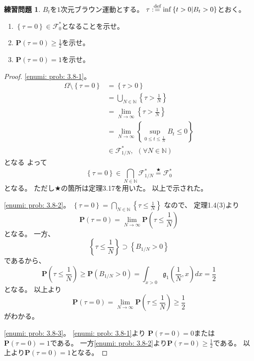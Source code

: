 \documentclass[uplatex]{jsarticle}
\theoremstyle{definition}
\newtheorem{prob}[prob]{練習問題}
\def\N{\mathbb{N}}
\def\P{\mathbf{P}}
\def\mcF{\mathcal{F}}
\def\dfn{:\overset{\mbox{{\scriptsize def}}}{=}}
\begin{document}
\begin{prob}\label{prob: 3.8}
  \(B_t\)を\(1\)次元ブラウン運動とする。
  \(\tau \dfn \inf\left\{ t > 0 \middle| B_t > 0\right\}\)とおく。
  \begin{enumerate}
    \item \label{enumi: prob: 3.8-1}
    \(\left\{ \tau = 0\right\} \in \mcF_0^*\)となることを示せ。
    \item \label{enumi: prob: 3.8-2}
    \(\P(\tau = 0) \geq \frac{1}{2}\)を示せ。
    \item \label{enumi: prob: 3.8-3}
    \(\P(\tau = 0) = 1\)を示せ。
  \end{enumerate}
\end{prob}

\begin{proof}
  \ref{enumi: prob: 3.8-1}。
  \begin{align*}
    \Omega \setminus \left\{ \tau = 0\right\}
    &= \left\{ \tau > 0\right\} \\
    &= \bigcup_{N\in \N}\left\{ \tau > \frac{1}{N}\right\} \\
    &= \lim_{N\to \infty}\left\{ \tau > \frac{1}{N} \right\} \\
    &= \lim_{N\to \infty}
    \left\{ \sup_{0\leq t\leq \frac{1}{N}}B_t \leq 0\right\} \\
    &\in \mcF_{1/N}^* , \ \ (\forall N\in \N )
  \end{align*}
  となる
  よって
  \[
  \left\{ \tau = 0\right\} \in \bigcap_{N\in \N}\mcF_{1/N}^*
  \overset{\bigstar}{=} \mcF_0^*
  \]
  となる。
  ただし\(\bigstar\)の箇所は定理3.17を用いた。
  以上で示された。

  \ref{enumi: prob: 3.8-2}。
  \(\left\{ \tau = 0 \right\} =
  \bigcap _{N\in \N}\left\{\tau \leq \frac{1}{N}\right\}\)
  なので、
  定理1.4(3)より
  \[
  \P(\tau = 0) = \lim_{N\to \infty} \P\left(\tau \leq \frac{1}{N}\right)
  \]
  となる。
  一方、
  \[
  \left\{ \tau \leq \frac{1}{N} \right\} \supset
  \left\{ B_{1/N} > 0 \right\}
  \]
  であるから、
  \[
  \P\left( \tau \leq \frac{1}{N} \right) \geq
  \P\left( B_{1/N} > 0 \right)
  = \int_{x>0}\mathfrak{g}_1\left(\frac{1}{N},x\right) dx
  = \frac{1}{2}
  \]
  となる。
  以上より
  \[
  \P( \tau = 0 ) = \lim_{N\to \infty} \P\left( \tau \leq \frac{1}{N} \right)
  \geq \frac{1}{2}
  \]
  がわかる。

  \ref{enumi: prob: 3.8-3}。
  \ref{enumi: prob: 3.8-1}より
  \(\P(\tau = 0) = 0\)または\(\P(\tau = 0) = 1\)である。
  一方\ref{enumi: prob: 3.8-2}より\(\P(\tau = 0) \geq \frac{1}{2}\)である。
  以上より\(\P(\tau = 0)=1\)となる。
\end{proof}
\end{document}
